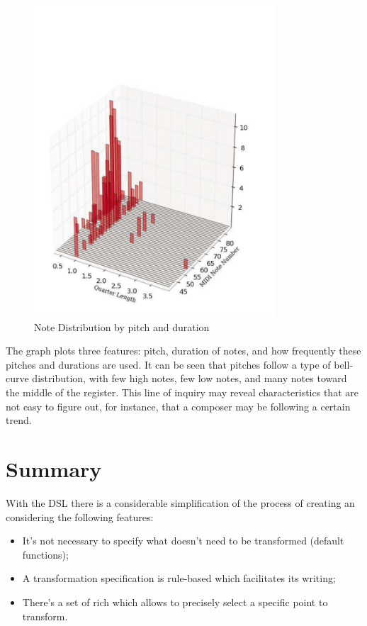\begin{figure}[htb]
  \centering
  \includegraphics[width=0.8\textwidth, clip=true, trim = 15mm 10mm 20mm 70mm]{img/plot.pdf}
  \caption{Note Distribution by pitch and duration}
  \label{fig:note_distribution}
\end{figure}

The graph plots three features: pitch, duration of notes, and how frequently these pitches and
durations are used. It can be seen that pitches follow a type of bell-curve distribution, with few
high notes, few low notes, and many notes toward the middle of the register.  This line of inquiry
may reveal characteristics that are not easy to figure out, for instance, that a composer may be
following a certain trend.

\section{Summary}

With the \ac{DSL} \abcdt{} there is a considerable simplification of the process of creating an
\abcpt{} considering the following features:

\begin{itemize}
  \item It's not necessary to specify what doesn't need to be transformed (default functions);
  \item A transformation specification is rule-based which facilitates its writing;
  \item There's a set of rich \actuators{} which allows to precisely select a specific point to
  transform.
\end{itemize}

